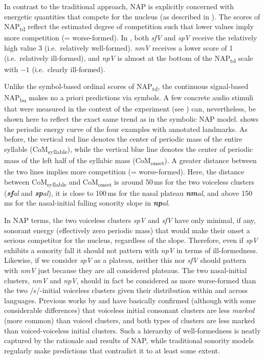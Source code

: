 In contrast to the traditional approach, NAP is explicitly concerned with energetic quantities that compete for the nucleus (as described in ).
The scores of NAP\textsubscript{td} reflect the estimated degree of competition such that lower values imply more competition (= worse-formed).
In , both \emph{sfV} and \emph{spV} receive the relatively high value 3 (i.e.~relatively well-formed). \emph{nmV} receives a lower score of 1 (i.e.~relatively ill-formed), and \emph{npV} is almost at the bottom of the NAP\textsubscript{td} scale with $-1$ (i.e.~clearly ill-formed).

Unlike the symbol-based ordinal scores of NAP\textsubscript{td}, the continuous signal-based NAP\textsubscript{bu} makes no a priori predictions via symbols. A few concrete audio stimuli that were measured in the context of the experiment (see ) can, nevertheless, be shown here to reflect the exact same trend as in the symbolic NAP model.  shows the periodic energy curve of the four examples with annotated landmarks.
As before, the vertical red line denotes the center of periodic mass of the entire syllable ({CoM\textsubscript{syllable}}), while the vertical blue line denotes the center of periodic mass of the left half of the syllabic mass ({CoM\textsubscript{onset}}). A greater distance between the two lines implies more competition (= worse-formed). Here, the distance between {CoM\textsubscript{syllable}} and {CoM\textsubscript{onset}} is around 50\,ms for the two voiceless clusters (\emph{\textbf{sf}al} and \emph{\textbf{sp}al}), it is close to 100\,ms for the nasal plateau \emph{\textbf{nm}al}, and above 150\,ms for the nasal-initial falling sonority slope in \emph{\textbf{np}al}.

In NAP terms, the two voiceless clusters \emph{spV} and \emph{sfV} have only minimal, if any, sonorant energy (effectively zero periodic mass) that would make their onset a serious competitor for the nucleus, regardless of the slope. Therefore, even if \emph{spV} exhibits a sonority fall it should not pattern with \emph{npV} in terms of ill-formedness. Likewise, if we consider \emph{spV} as a plateau, neither this nor \emph{sfV} should pattern with \emph{nmV} just because they are all considered plateaus. The two nasal-initial clusters, \emph{nmV} and \emph{npV}, should in fact be considered as more worse-formed than the two /s/-initial voiceless clusters given their distribution within and across languages. Previous works by \citet{greenberg1978some, lindblom1983production, lombardi1995laryngeal, lombardi1991laryngeal} and \citet{kreitman2008phoneticssk, kreitman2010mixed} have basically confirmed (although with some considerable differences) that voiceless initial consonant clusters are less \emph{marked} (more common) than voiced clusters, and both types of clusters are less marked than voiced-voiceless initial clusters. Such a hierarchy of well-formedness is neatly captured by the rationale and results of NAP, while traditional sonority models regularly make predictions that contradict it to at least some extent.
